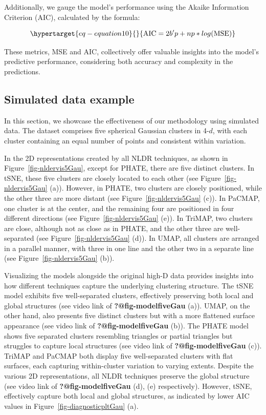 \documentclass[
  12pt]{article}
\begin{document}
Additionally, we gauge the model's performance using the Akaike
Information Criterion (AIC), calculated by the formula:

\begin{equation}\protect\hypertarget{eq-equation10}{}{
\text{AIC} = 2b'p + np * log(\text{MSE})
}\label{eq-equation10}\end{equation}

These metrics, MSE and AIC, collectively offer valuable insights into
the model's predictive performance, considering both accuracy and
complexity in the predictions.

\hypertarget{sec-simpleex}{%
\subsection{Simulated data example}\label{sec-simpleex}}

In this section, we showcase the effectiveness of our methodology using
simulated data. The dataset comprises five spherical Gaussian clusters
in 4-\(d\), with each cluster containing an equal number of points and
consistent within variation.

In the 2D representations created by all NLDR techniques, as shown in
Figure~\ref{fig-nldervis5Gau}, except for PHATE, there are five distinct
clusters. In tSNE, these five clusters are closely located to each other
(see Figure~\ref{fig-nldervis5Gau} (a)). However, in PHATE, two clusters
are closely positioned, while the other three are more distant (see
Figure~\ref{fig-nldervis5Gau} (c)). In PaCMAP, one cluster is at the
center, and the remaining four are positioned in four different
directions (see Figure~\ref{fig-nldervis5Gau} (e)). In TriMAP, two
clusters are close, although not as close as in PHATE, and the other
three are well-separated (see Figure~\ref{fig-nldervis5Gau} (d)). In
UMAP, all clusters are arranged in a parallel manner, with three in one
line and the other two in a separate line (see
Figure~\ref{fig-nldervis5Gau} (b)).

Visualizing the models alongside the original high-D data provides
insights into how different techniques capture the underlying clustering
structure. The tSNE model exhibits five well-separated clusters,
effectively preserving both local and global structures (see video link
of \textbf{?@fig-modelfiveGau} (a)). UMAP, on the other hand, also
presents five distinct clusters but with a more flattened surface
appearance (see video link of \textbf{?@fig-modelfiveGau} (b)). The
PHATE model shows five separated clusters resembling triangles or
partial triangles but struggles to capture local structures (see video
link of \textbf{?@fig-modelfiveGau} (c)). TriMAP and PaCMAP both display
five well-separated clusters with flat surfaces, each capturing
within-cluster variation to varying extents. Despite the various 2D
representations, all NLDR techniques preserve the global structure (see
video link of \textbf{?@fig-modelfiveGau} (d), (e) respectively).
However, tSNE, effectively capture both local and global structures, as
indicated by lower AIC values in Figure~\ref{fig-diagnosticpltGau} (a).
\end{document}
